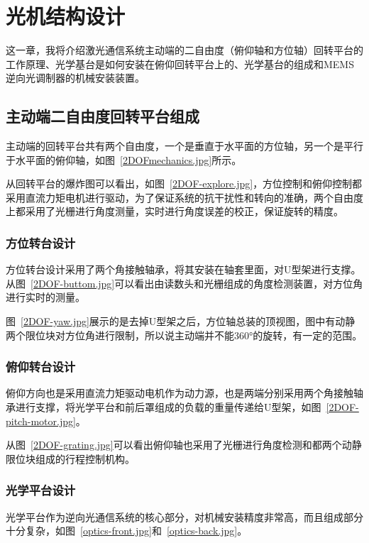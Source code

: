 \chapter{光机结构设计}
这一章，我将介绍激光通信系统主动端的二自由度（俯仰轴和方位轴）回转平台的工作原理、光学基台是如何安装在俯仰回转平台上的、光学基台的组成和MEMS逆向光调制器的机械安装装置。
\section{主动端二自由度回转平台组成}




主动端的回转平台共有两个自由度，一个是垂直于水平面的方位轴，另一个是平行于水平面的俯仰轴，如图~\ref{2DOFmechanics.jpg}所示。


从回转平台的爆炸图可以看出，如图~\ref{2DOF-explore.jpg}，方位控制和俯仰控制都采用直流力矩电机进行驱动，为了保证系统的抗干扰性和转向的准确，两个自由度上都采用了光栅进行角度测量，实时进行角度误差的校正，保证旋转的精度。

\subsection{方位转台设计}
方位转台设计采用了两个角接触轴承，将其安装在轴套里面，对U型架进行支撑。从图~\ref{2DOF-buttom.jpg}可以看出由读数头和光栅组成的角度检测装置，对方位角进行实时的测量。

图~\ref{2DOF-yaw.jpg}展示的是去掉U型架之后，方位轴总装的顶视图，图中有动静两个限位块对方位角进行限制，所以说主动端并不能360°的旋转，有一定的范围。

\subsection{俯仰转台设计}
俯仰方向也是采用直流力矩驱动电机作为动力源，也是两端分别采用两个角接触轴承进行支撑，将光学平台和前后罩组成的负载的重量传递给U型架，如图~\ref{2DOF-pitch-motor.jpg}。

从图~\ref{2DOF-grating.jpg}可以看出俯仰轴也采用了光栅进行角度检测和都两个动静限位块组成的行程控制机构。


\subsection{光学平台设计}
光学平台作为逆向光通信系统的核心部分，对机械安装精度非常高，而且组成部分十分复杂，如图~\ref{optics-front.jpg}和~\ref{optics-back.jpg}。

